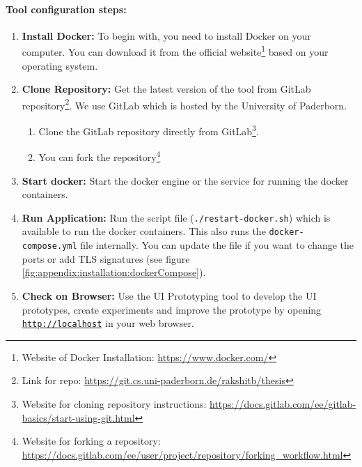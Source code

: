 \paragraph{Tool configuration steps:}

\begin{enumerate}
\item \textbf{Install Docker:} To begin with, you need to install Docker on your computer. 
You can download it from the official website\footnote{Website of Docker Installation: \url{https://www.docker.com/}} based on your operating system.
\clearpage
\item \textbf{Clone Repository:} Get the latest version of the tool from GitLab repository\footnote{Link for repo: \url{https://git.cs.uni-paderborn.de/rakshitb/thesis}}. We use GitLab which is hosted by the University of Paderborn.
\begin{enumerate}
	\item Clone the GitLab repository directly from GitLab\footnote{Website for cloning repository instructions: \url{https://docs.gitlab.com/ee/gitlab-basics/start-using-git.html}}.
	\item You can fork the repository\footnote{Website for forking a repository: \url{https://docs.gitlab.com/ee/user/project/repository/forking_workflow.html}} 
\end{enumerate}
\item \textbf{Start docker:} Start the docker engine or the service for running the docker containers.
\item \textbf{Run Application:} Run the script file (\texttt{./restart-docker.sh}) which is available to run the docker containers. This also runs the \texttt{docker-compose.yml} file internally. You can update the file if you want to change the ports or add TLS signatures (see figure \ref{fig:appendix:installation:dockerCompose}).
\item \textbf{Check on Browser:} Use the UI Prototyping tool to develop the UI prototypes, create experiments and improve the prototype by opening \texttt{\url{http://localhost}} in your web browser.
\end{enumerate}